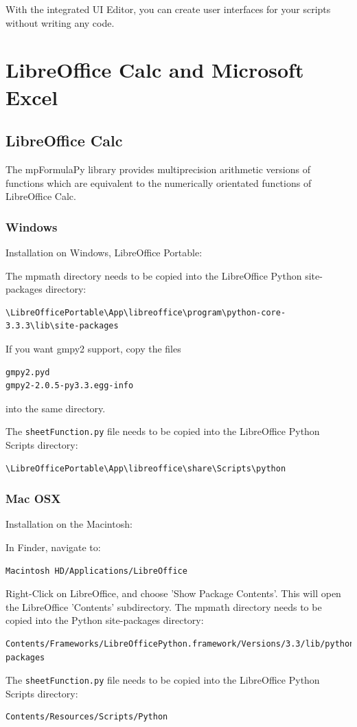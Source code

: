 With the integrated UI Editor, you can create user interfaces for your scripts without writing any code.





\chapter{LibreOffice Calc and Microsoft Excel}
\label{Spreadsheets} 


\section{LibreOffice Calc}
The mpFormulaPy library provides multiprecision arithmetic versions of  functions which are equivalent to the numerically orientated functions of LibreOffice Calc.


\subsection{Windows}
Installation on Windows, LibreOffice Portable:

The mpmath directory needs to be copied into the LibreOffice Python site-packages directory:
\begin{verbatim}
\LibreOfficePortable\App\libreoffice\program\python-core-3.3.3\lib\site-packages
\end{verbatim}
If you want gmpy2 support, copy the files 
\begin{verbatim}
gmpy2.pyd
gmpy2-2.0.5-py3.3.egg-info
\end{verbatim}
into the same directory.
	
The \verb|sheetFunction.py| file needs to be copied into the  LibreOffice Python Scripts directory:
\begin{verbatim}
\LibreOfficePortable\App\libreoffice\share\Scripts\python
\end{verbatim}


\subsection{Mac OSX}
Installation on the Macintosh:

In Finder, navigate to:
\begin{verbatim}
Macintosh HD/Applications/LibreOffice
\end{verbatim}	
Right-Click on LibreOffice, and choose 'Show Package Contents'. This will open the LibreOffice  'Contents' subdirectory.
The mpmath directory needs to be copied into the Python site-packages directory:
\begin{verbatim}
Contents/Frameworks/LibreOfficePython.framework/Versions/3.3/lib/python3.3/site-packages
\end{verbatim}
The \verb|sheetFunction.py| file needs to be copied into the  LibreOffice Python Scripts directory:
\begin{verbatim}
Contents/Resources/Scripts/Python
\end{verbatim}


